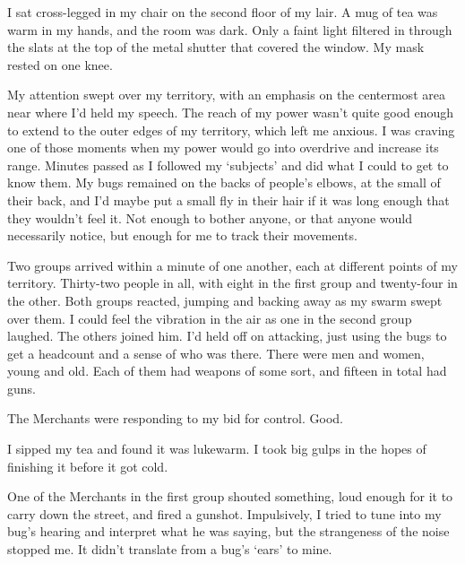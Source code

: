 





I sat cross-legged in my chair on the second floor of my lair.  A mug of tea was warm in my hands, and the room was dark.  Only a faint light filtered in through the slats at the top of the metal shutter that covered the window.  My mask rested on one knee.



My attention swept over my territory, with an emphasis on the centermost area near where I'd held my speech.  The reach of my power wasn't quite good enough to extend to the outer edges of my territory, which left me anxious.  I was craving one of those moments when my power would go into overdrive and increase its range.  Minutes passed as I followed my `subjects' and did what I could to get to know them.  My bugs remained on the backs of people's elbows, at the small of their back, and I'd maybe put a small fly in their hair if it was long enough that they wouldn't feel it.  Not enough to bother anyone, or that anyone would necessarily notice, but enough for me to track their movements.



Two groups arrived within a minute of one another, each at different points of my territory.  Thirty-two people in all, with eight in the first group and twenty-four in the other.  Both groups reacted, jumping and backing away as my swarm swept over them.  I could feel the vibration in the air as one in the second group laughed.  The others joined him.  I'd held off on attacking, just using the bugs to get a headcount and a sense of who was there.  There were men and women, young and old.  Each of them had weapons of some sort, and fifteen in total had guns.



The Merchants were responding to my bid for control.  Good.



I sipped my tea and found it was lukewarm.  I took big gulps in the hopes of finishing it before it got cold.



One of the Merchants in the first group shouted something, loud enough for it to carry down the street, and fired a gunshot.  Impulsively, I tried to tune into my bug's hearing and interpret what he was saying, but the strangeness of the noise stopped me.  It didn't translate from a bug's `ears' to mine.




